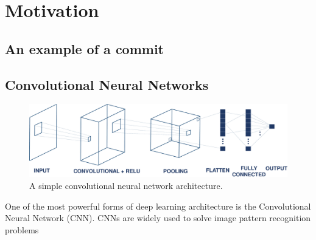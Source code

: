 
\section{Motivation}
\label{sec:motivation}

\subsection{An example of a commit }
\label{sec:examle}

\subsection{Convolutional Neural Networks}
\label{sec:background_cnn}
\begin{figure}[t!]
\center
\includegraphics[scale=0.3]{figs/cnn.pdf}
\caption{A simple convolutional neural network architecture.}
\label{fig:cnn}
\end{figure}

One of the most powerful forms of deep learning architecture is the Convolutional Neural Network (CNN). CNNs are widely used to solve image pattern recognition problems 

